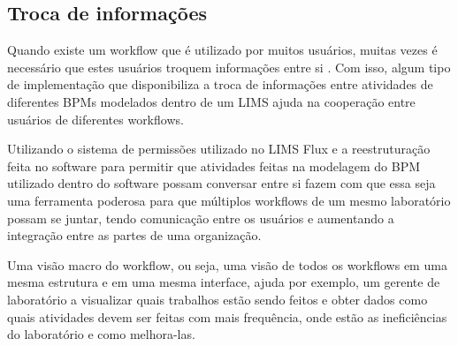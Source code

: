 \subsection{Troca de informações}


Quando existe um workflow que é utilizado por muitos usuários, muitas vezes é necessário que estes usuários troquem informações entre si \R. Com isso, algum tipo de implementação que disponibiliza a troca de informações entre atividades de diferentes BPMs modelados dentro de um LIMS ajuda na cooperação entre usuários de diferentes workflows.


Utilizando o sistema de permissões utilizado no LIMS Flux \R e a reestruturação feita no software para permitir que atividades feitas na modelagem do BPM utilizado dentro do software possam conversar entre si fazem com que essa seja uma ferramenta poderosa para que múltiplos workflows de um mesmo laboratório possam se juntar, tendo comunicação entre os usuários e aumentando a integração entre as partes de uma organização.




Uma visão macro do workflow, ou seja, uma visão de todos os workflows em uma mesma estrutura e em uma mesma interface, ajuda por exemplo, um gerente de laboratório a visualizar quais trabalhos estão sendo feitos e obter dados como quais atividades devem ser feitas com mais frequência, onde estão as ineficiências do laboratório e como melhora-las.


